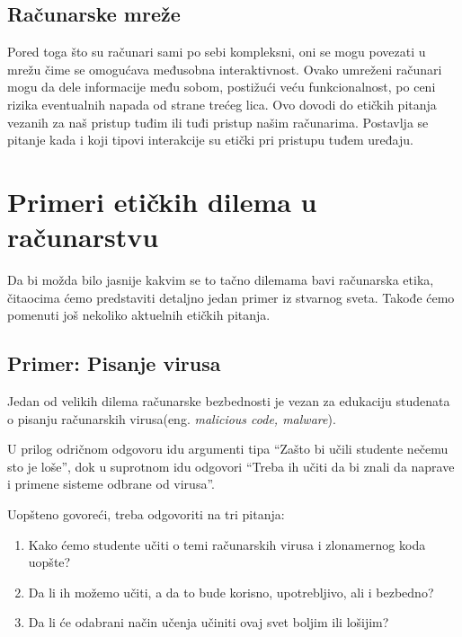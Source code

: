 \documentclass[a4paper]{article}
\begin{document}
\subsection{Računarske mreže}
Pored toga što su računari sami po sebi kompleksni, oni se mogu povezati u mrežu čime se omogućava međusobna interaktivnost. Ovako umreženi računari mogu da dele informacije među sobom, postižući veću funkcionalnost, po ceni rizika eventualnih napada od strane trećeg lica. Ovo dovodi do etičkih pitanja vezanih za naš pristup tuđim ili tuđi pristup našim računarima. Postavlja se pitanje kada i koji tipovi interakcije su etički pri pristupu tuđem uređaju.


\section{Primeri etičkih dilema u računarstvu}

Da bi možda bilo jasnije kakvim se to tačno dilemama bavi računarska etika, čitaocima ćemo predstaviti detaljno jedan primer iz stvarnog sveta. Takođe ćemo pomenuti još nekoliko aktuelnih etičkih pitanja.

\subsection{Primer: Pisanje virusa}
Jedan od velikih dilema računarske bezbednosti je vezan za edukaciju studenata o pisanju računarskih virusa(eng. \textit{malicious code, malware}).

U prilog odričnom odgovoru idu argumenti tipa ``Zašto bi učili studente nečemu sto je loše'', dok u suprotnom idu odgovori ``Treba ih učiti da bi znali da
naprave i primene sisteme odbrane od virusa''.

Uopšteno govoreći, treba odgovoriti na tri pitanja:
\begin{enumerate}
	\item Kako ćemo studente učiti o temi računarskih virusa i zlonamernog koda uopšte?
	\item Da li ih možemo učiti, a da to bude korisno, upotrebljivo, ali i bezbedno?
	\item Da li će odabrani način učenja učiniti ovaj svet boljim ili lošijim?
\end{enumerate}
\end{document}
